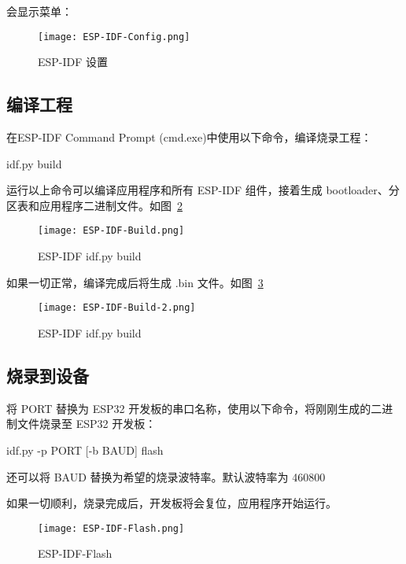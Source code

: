 会显示菜单：

\begin{figure}[htbp]
    \centering
    \texttt{[image: ESP-IDF-Config.png]}
    \caption{ESP-IDF 设置}
    \label{ESP-IDF-Config}
\end{figure}

\subsection{编译工程}

在ESP-IDF Command Prompt (cmd.exe)中使用以下命令，编译烧录工程：

\begin{tcolorbox}
    idf.py build
\end{tcolorbox}

运行以上命令可以编译应用程序和所有 ESP-IDF 组件，接着生成 bootloader、分区表和应用程序二进制文件。如图~\ref{fig:ESP-IDF-Build}

\begin{figure}[htbp]
    \centering
    \texttt{[image: ESP-IDF-Build.png]}
    \caption{ESP-IDF idf.py build}
    \label{fig:ESP-IDF-Build}
\end{figure}

如果一切正常，编译完成后将生成 .bin 文件。如图~\ref{fig:ESP-IDF-Build-2}

\begin{figure}[htbp]
    \centering
    \texttt{[image: ESP-IDF-Build-2.png]}
    \caption{ESP-IDF idf.py build}
    \label{fig:ESP-IDF-Build-2}
\end{figure}

\subsection{烧录到设备}

将 PORT 替换为 ESP32 开发板的串口名称，使用以下命令，将刚刚生成的二进制文件烧录至 ESP32 开发板：

\begin{tcolorbox}
    idf.py -p PORT [-b BAUD] flash
\end{tcolorbox}

还可以将 BAUD 替换为希望的烧录波特率。默认波特率为 460800

如果一切顺利，烧录完成后，开发板将会复位，应用程序开始运行。

\begin{figure}[htbp]
    \centering
    \texttt{[image: ESP-IDF-Flash.png]}
    \caption{ESP-IDF-Flash}
    \label{fig:ESP-IDF-Flash}
\end{figure}

